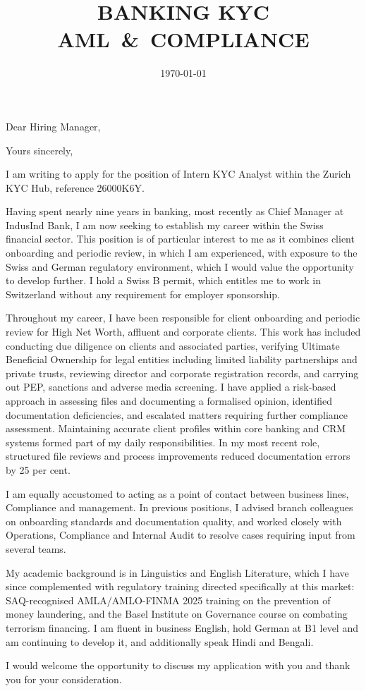 \documentclass[11pt,a4paper,sans]{moderncv}
\title{BANKING \textbar{} KYC \textbar{} \mbox{AML \& COMPLIANCE}}
\begin{document}
\date{\today}
\opening{Dear Hiring Manager,}
\closing{Yours sincerely,}

\makelettertitle

I am writing to apply for the position of Intern KYC Analyst within the Zurich
KYC Hub, reference 26000K6Y.

Having spent nearly nine years in banking, most recently as Chief Manager at
IndusInd Bank, I am now seeking to establish my career within the Swiss
financial sector. This position is of particular interest to me as it combines
client onboarding and periodic review, in which I am experienced, with exposure
to the Swiss and German regulatory environment, which I would value the
opportunity to develop further. I hold a Swiss B permit, which entitles me to
work in Switzerland without any requirement for employer sponsorship.

Throughout my career, I have been responsible for client onboarding and periodic
review for High Net Worth, affluent and corporate clients. This work has
included conducting due diligence on clients and associated parties, verifying
Ultimate Beneficial Ownership for legal entities including limited liability
partnerships and private trusts, reviewing director and corporate registration
records, and carrying out PEP, sanctions and adverse media screening. I have
applied a risk-based approach in assessing files and documenting a formalised
opinion, identified documentation deficiencies, and escalated matters requiring
further compliance assessment. Maintaining accurate client profiles within core
banking and CRM systems formed part of my daily responsibilities. In my most
recent role, structured file reviews and process improvements reduced
documentation errors by 25 per cent.

I am equally accustomed to acting as a point of contact between business lines,
Compliance and management. In previous positions, I advised branch colleagues on
onboarding standards and documentation quality, and worked closely with
Operations, Compliance and Internal Audit to resolve cases requiring input from
several teams.

My academic background is in Linguistics and English Literature, which I have
since complemented with regulatory training directed specifically at this
market: SAQ-recognised AMLA/AMLO-FINMA 2025 training on the prevention of money
laundering, and the Basel Institute on Governance course on combating terrorism
financing. I am fluent in business English, hold German at B1 level and am
continuing to develop it, and additionally speak Hindi and Bengali.

I would welcome the opportunity to discuss my application with you and thank
you for your consideration.

\makeletterclosing
\end{document}
